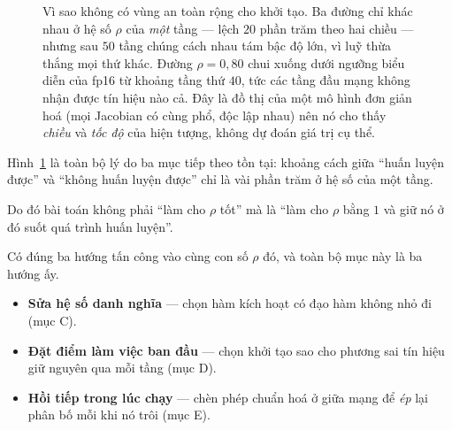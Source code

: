 \documentclass[../../../deep_learning.tex]{subfiles}
\begin{document}
\begin{figure}[H]\centering
{}
\caption{Vì sao không có vùng an toàn rộng cho khởi tạo. Ba đường chỉ khác nhau ở hệ số \(\rho\) của \emph{một} tầng --- lệch \(20\) phần trăm theo hai chiều --- nhưng sau \(50\) tầng chúng cách nhau tám bậc độ lớn, vì luỹ thừa thắng mọi thứ khác. Đường \(\rho = 0{,}80\) chui xuống dưới ngưỡng biểu diễn của fp16 từ khoảng tầng thứ \(40\), tức các tầng đầu mạng không nhận được tín hiệu nào cả. Đây là đồ thị của một mô hình đơn giản hoá (mọi Jacobian có cùng phổ, độc lập nhau) nên nó cho thấy \emph{chiều} và \emph{tốc độ} của hiện tượng, không dự đoán giá trị cụ thể.}
\label{fig:gradient-theo-do-sau}
\end{figure}

Hình~\ref{fig:gradient-theo-do-sau} là toàn bộ lý do ba mục tiếp theo tồn tại: khoảng cách giữa ``huấn luyện được'' và ``không huấn luyện được'' chỉ là vài phần trăm ở hệ số của một tầng.

 Do đó bài toán không phải ``làm cho \(\rho\) tốt'' mà là ``làm cho \(\rho\) bằng \(1\) và giữ nó ở đó suốt quá trình huấn luyện''.

Có đúng ba hướng tấn công vào cùng con số \(\rho\) đó, và toàn bộ mục này là ba hướng ấy.

\begin{itemize}
\item \textbf{Sửa hệ số danh nghĩa} --- chọn hàm kích hoạt có đạo hàm không nhỏ đi (mục C).
\item \textbf{Đặt điểm làm việc ban đầu} --- chọn khởi tạo sao cho phương sai tín hiệu giữ nguyên qua mỗi tầng (mục D).
\item \textbf{Hồi tiếp trong lúc chạy} --- chèn phép chuẩn hoá ở giữa mạng để \emph{ép} lại phân bố mỗi khi nó trôi (mục E).
\end{itemize}
\end{document}
